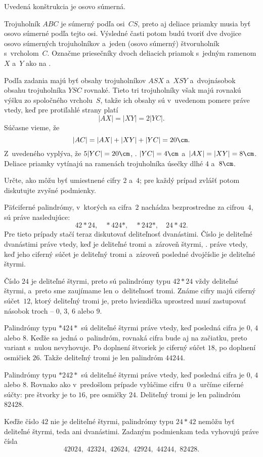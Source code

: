 {%
\napad
Uvedená konštrukcia je osovo súmerná.

\riesenie
Trojuholník $ABC$ je súmerný podľa osi~$CS$, preto aj deliace priamky musia
byť osovo súmerné podľa tejto osi.
Výsledné časti potom budú tvoriť dve dvojice osovo súmerných trojuholníkov
a~jeden (osovo súmerný) štvoruholník s~vrcholom~$C$.
Označme priesečníky dvoch deliacich priamok s~jedným ramenom $X$ a~$Y$ ako na \obr.
%

Podľa zadania majú byť obsahy trojuholníkov $ASX$ a~$XSY$ a~dvojnásobok obsahu
trojuholníka $YSC$ rovnaké.
Tieto tri trojuholníky však majú rovnakú výšku zo spoločného vrcholu~$S$,
takže ich obsahy sú v~uvedenom pomere práve vtedy, keď pre protiľahlé
strany platí
$$
|AX|=|XY|=2|YC|.
$$
Súčasne vieme, že
$$
|AC|=|AX|+|XY|+|YC|=20\cm.
$$
Z~uvedeného vyplýva, že $5|YC|=20\cm$, \tj. $|YC|=4\cm$ a~$|AX|=|XY|=8\cm$.
Deliace priamky vytínajú na ramenách trojuholníka úsečky dlhé $4$ a~$8\cm$.
}

{%
\napad
Určte, ako môžu byť umiestnené cifry $2$ a~$4$; pre každý prípad zvlášť potom
diskutujte zvyšné podmienky.

\riesenie
Päťciferné palindrómy, v~ktorých sa cifra~$2$ nachádza bezprostredne za
cifrou~$4$, sú práve nasledujúce:
$$
42{*}24,\quad {*}424{*},\quad {*}242{*},\quad 24{*}42.
$$
Pre tieto prípady stačí teraz diskutovať deliteľnosť dvanástimi.
Číslo je deliteľné dvanástimi práve vtedy, keď je deliteľné tromi a~zároveň
štyrmi, \tj. práve vtedy, keď jeho ciferný súčet je deliteľný tromi
a~zároveň posledné dvojčíslie je deliteľné štyrmi.

Číslo $24$ je deliteľné štyrmi, preto sú palindrómy typu $42{*}24$
vždy deliteľné štyrmi, a~preto sme zaujímame len o~deliteľnosť tromi.
Známe cifry majú ciferný súčet~$12$, ktorý deliteľný tromi je, preto
hviezdička uprostred musí zastupovať násobok troch -- $0$, $3$, $6$ alebo $9$.

Palindrómy typu ${*}424{*}$ sú deliteľné štyrmi práve vtedy, keď posledná
cifra je $0$, $4$ alebo $8$. Keďže sa jedná o~palindróm, rovnaká cifra bude aj na
začiatku, preto variant s~nulou nevyhovuje. Po doplnení štvoriek je ciferný
súčet $18$, po doplnení osmičiek $26$. Takže deliteľný tromi je len palindróm
$44244$.

Palindrómy typu ${*}242{*}$ sú deliteľné štyrmi práve vtedy, keď posledná
cifra je $0$, $4$ alebo $8$.
Rovnako ako v~predošlom prípade vylúčime cifru~$0$ a~určíme ciferné súčty:
pre štvorky je to $16$, pre osmičky $24$. Deliteľný tromi je len palindróm
$82428$.

Keďže číslo $42$ nie je deliteľné štyrmi, palindrómy typu $24{*}42$
nemôžu byť deliteľné štyrmi, teda ani dvanástimi.
Zadaným podmienkam teda vyhovujú práve čísla
$$
42024,\,\, 42324,\,\, 42624,\,\, 42924,\,\, 44244,\,\, 82428.
$$
}

